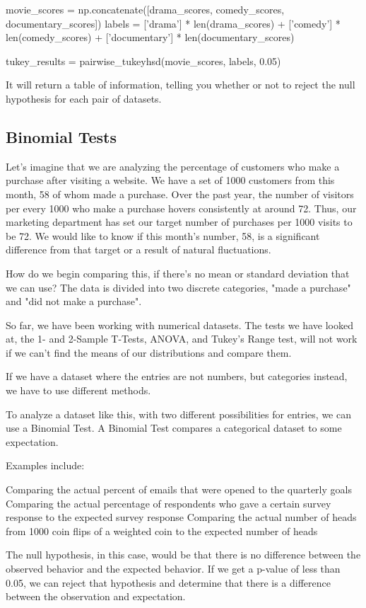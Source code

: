 \documentclass{journal}
\begin{document}
movie_scores = np.concatenate([drama_scores, comedy_scores, documentary_scores])
labels = ['drama'] * len(drama_scores) + ['comedy'] * len(comedy_scores) + ['documentary'] * len(documentary_scores)

tukey_results = pairwise_tukeyhsd(movie_scores, labels, 0.05)

It will return a table of information, telling you whether or not to reject the null hypothesis for each pair of datasets.

\subsection{Binomial Tests}
Let's imagine that we are analyzing the percentage of customers who make a purchase after visiting a website. We have a set of 1000 customers from this month, 58 of whom made a purchase. Over the past year, the number of visitors per every 1000 who make a purchase hovers consistently at around 72. Thus, our marketing department has set our target number of purchases per 1000 visits to be 72. We would like to know if this month's number, 58, is a significant difference from that target or a result of natural fluctuations.

How do we begin comparing this, if there's no mean or standard deviation that we can use? The data is divided into two discrete categories, "made a purchase" and "did not make a purchase".

So far, we have been working with numerical datasets. The tests we have looked at, the 1- and 2-Sample T-Tests, ANOVA, and Tukey's Range test, will not work if we can't find the means of our distributions and compare them.

If we have a dataset where the entries are not numbers, but categories instead, we have to use different methods.

To analyze a dataset like this, with two different possibilities for entries, we can use a Binomial Test. A Binomial Test compares a categorical dataset to some expectation.

Examples include:

    Comparing the actual percent of emails that were opened to the quarterly goals
    Comparing the actual percentage of respondents who gave a certain survey response to the expected survey response
    Comparing the actual number of heads from 1000 coin flips of a weighted coin to the expected number of heads

The null hypothesis, in this case, would be that there is no difference between the observed behavior and the expected behavior. If we get a p-value of less than 0.05, we can reject that hypothesis and determine that there is a difference between the observation and expectation.
\end{document}
